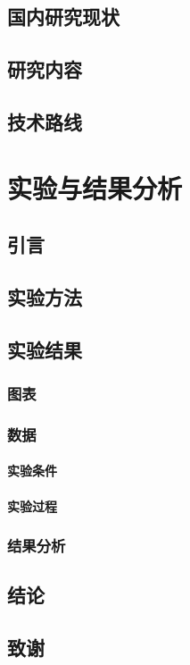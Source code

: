 \documentclass{ctexbook}%
\begin{document}
	\section{国内研究现状}
	\section{研究内容}
	\section{技术路线}
	\chapter{实验与结果分析}
	\section{引言}
	\section{实验方法}
	\section{实验结果}
	\subsection{图表}
	\subsection{数据}
	\subsubsection{实验条件}
	\subsubsection{实验过程}
	\subsection{结果分析}
	\section{结论}
	\section{致谢}
	
\end{document}

